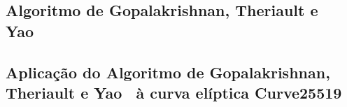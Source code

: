 \subsection{Algoritmo de Gopalakrishnan, Theriault e Yao~\cite{GopalakrishnanTheriaultYao07}}

\subsection{Aplicação do Algoritmo de Gopalakrishnan, Theriault e Yao~\cite{GopalakrishnanTheriaultYao07} à curva elíptica Curve25519}

